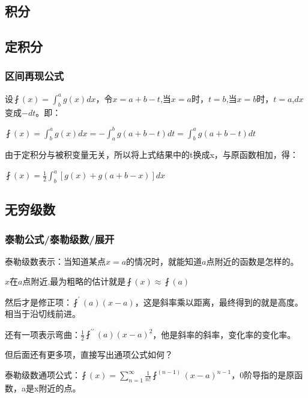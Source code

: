 \documentclass[UTF8]{ctexbook}
\newcommand{\derivative}{^\prime}
\newcommand{\doubleDerivative}{^{\prime\prime}}
\newcommand{\aLotDerivative}[1]{^{(#1)}}
\newcommand{\UpDownSum}[2]{\sum\limits_{#1}^{#2}}
\newcommand{\fDerivative}[1]{\fint\derivative(#1)}
\newcommand{\defFunction}[1]{\fint(#1)}
\newcommand{\definiteIntegral}[2]{\int^{#1}_{#2}}
\begin{document}
{{{}%

\subsection{积分}{

}%

\subsection{定积分}{

  \subsubsection{区间再现公式}{
    设$\defFunction{x} = \definiteIntegral{a}{b}g(x)dx$，令$x = a + b - t$,当$x = a$时，$t = b$,当$x = b$时，$t = a$,$dx$变成$-dt$。即：

    $\defFunction{x} = \definiteIntegral{a}{b}g(x)dx = -\definiteIntegral{b}{a}g(a+b-t)dt = \definiteIntegral{a}{b}g(a + b - t)dt$

    由于定积分与被积变量无关，所以将上式结果中的t换成x，与原函数相加，得：

    $\defFunction{x} = \frac{1}{2}\definiteIntegral{a}{b}[g(x) + g(a + b - x)]dx$
  }%

}%

\subsection{无穷级数}{

\subsubsection{泰勒公式/泰勒级数/展开}{
泰勒级数表示：当知道某点$x = a$的情况时，就能知道$a$点附近的函数是怎样的。

$x$在$a$点附近,最为粗略的估计就是$\defFunction{x} \approx \defFunction{a}$

然后才是修正项：$\fDerivative{a}(x - a)$，这是斜率乘以距离，最终得到的就是高度。相当于沿切线前进。

还有一项表示弯曲：$\frac{1}{2}\fint\doubleDerivative(a)(x - a)^2$，他是斜率的斜率，变化率的变化率。

但后面还有更多项，直接写出通项公式如何？

泰勒级数通项公式：$\defFunction{x} = \UpDownSum{n = 1}{\infty}\frac{1}{n!}\fint\aLotDerivative{n - 1}(x - a)^{n - 1}$，0阶导指的是原函数，a是x附近的点。

}}}}
\end{document}
